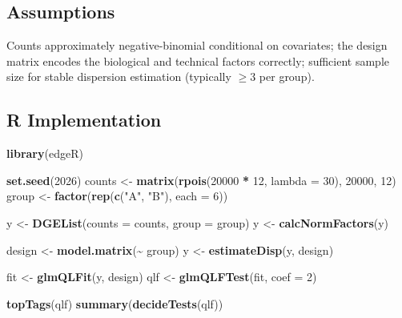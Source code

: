 \documentclass[
]{article}
\newenvironment{Shaded}{\begin{snugshade}}{\end{snugshade}}
\newcommand{\AttributeTok}[1]{\textcolor[rgb]{0.13,0.29,0.53}{#1}}
\newcommand{\DecValTok}[1]{\textcolor[rgb]{0.00,0.00,0.81}{#1}}
\newcommand{\FunctionTok}[1]{\textcolor[rgb]{0.13,0.29,0.53}{\textbf{#1}}}
\newcommand{\NormalTok}[1]{#1}
\newcommand{\OtherTok}[1]{\textcolor[rgb]{0.56,0.35,0.01}{#1}}
\newcommand{\SpecialCharTok}[1]{\textcolor[rgb]{0.81,0.36,0.00}{\textbf{#1}}}
\newcommand{\StringTok}[1]{\textcolor[rgb]{0.31,0.60,0.02}{#1}}
\begin{document}
\subsection{Assumptions}\label{assumptions}

Counts approximately negative-binomial conditional on covariates; the
design matrix encodes the biological and technical factors correctly;
sufficient sample size for stable dispersion estimation (typically
\(\ge 3\) per group).

\subsection{R Implementation}\label{r-implementation}

\begin{Shaded}
\begin{Highlighting}[]
\FunctionTok{library}\NormalTok{(edgeR)}

\FunctionTok{set.seed}\NormalTok{(}\DecValTok{2026}\NormalTok{)}
\NormalTok{counts }\OtherTok{\textless{}{-}} \FunctionTok{matrix}\NormalTok{(}\FunctionTok{rpois}\NormalTok{(}\DecValTok{20000} \SpecialCharTok{*} \DecValTok{12}\NormalTok{, }\AttributeTok{lambda =} \DecValTok{30}\NormalTok{), }\DecValTok{20000}\NormalTok{, }\DecValTok{12}\NormalTok{)}
\NormalTok{group }\OtherTok{\textless{}{-}} \FunctionTok{factor}\NormalTok{(}\FunctionTok{rep}\NormalTok{(}\FunctionTok{c}\NormalTok{(}\StringTok{"A"}\NormalTok{, }\StringTok{"B"}\NormalTok{), }\AttributeTok{each =} \DecValTok{6}\NormalTok{))}

\NormalTok{y }\OtherTok{\textless{}{-}} \FunctionTok{DGEList}\NormalTok{(}\AttributeTok{counts =}\NormalTok{ counts, }\AttributeTok{group =}\NormalTok{ group)}
\NormalTok{y }\OtherTok{\textless{}{-}} \FunctionTok{calcNormFactors}\NormalTok{(y)}

\NormalTok{design }\OtherTok{\textless{}{-}} \FunctionTok{model.matrix}\NormalTok{(}\SpecialCharTok{\textasciitilde{}}\NormalTok{ group)}
\NormalTok{y }\OtherTok{\textless{}{-}} \FunctionTok{estimateDisp}\NormalTok{(y, design)}

\NormalTok{fit }\OtherTok{\textless{}{-}} \FunctionTok{glmQLFit}\NormalTok{(y, design)}
\NormalTok{qlf }\OtherTok{\textless{}{-}} \FunctionTok{glmQLFTest}\NormalTok{(fit, }\AttributeTok{coef =} \DecValTok{2}\NormalTok{)}

\FunctionTok{topTags}\NormalTok{(qlf)}
\FunctionTok{summary}\NormalTok{(}\FunctionTok{decideTests}\NormalTok{(qlf))}
\end{Highlighting}
\end{Shaded}
\end{document}
